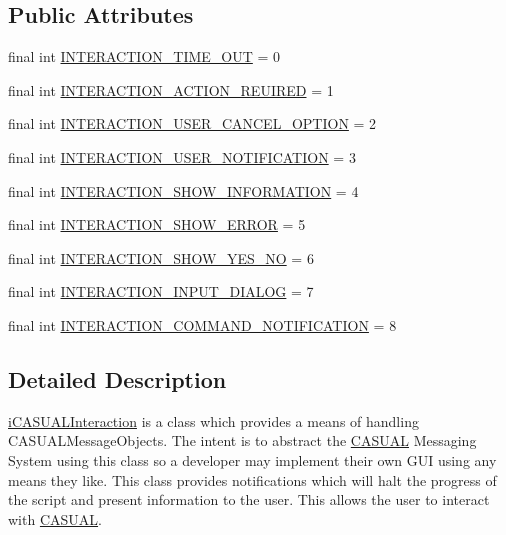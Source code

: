 \subsection*{Public Attributes}
\begin{DoxyCompactItemize}
\item 
final int \hyperlink{interfaceCASUAL_1_1iCASUALInteraction_ad8a93fbf136514ec2abf7042846bf8d8}{I\-N\-T\-E\-R\-A\-C\-T\-I\-O\-N\-\_\-\-T\-I\-M\-E\-\_\-\-O\-U\-T} = 0
\item 
final int \hyperlink{interfaceCASUAL_1_1iCASUALInteraction_a9cb2accb41f6b2de8f8076cda916924f}{I\-N\-T\-E\-R\-A\-C\-T\-I\-O\-N\-\_\-\-A\-C\-T\-I\-O\-N\-\_\-\-R\-E\-U\-I\-R\-E\-D} = 1
\item 
final int \hyperlink{interfaceCASUAL_1_1iCASUALInteraction_ab172a9affe078a64623627dc1ef6dcab}{I\-N\-T\-E\-R\-A\-C\-T\-I\-O\-N\-\_\-\-U\-S\-E\-R\-\_\-\-C\-A\-N\-C\-E\-L\-\_\-\-O\-P\-T\-I\-O\-N} = 2
\item 
final int \hyperlink{interfaceCASUAL_1_1iCASUALInteraction_aee60fbef84821ccb93b8508720af91e9}{I\-N\-T\-E\-R\-A\-C\-T\-I\-O\-N\-\_\-\-U\-S\-E\-R\-\_\-\-N\-O\-T\-I\-F\-I\-C\-A\-T\-I\-O\-N} = 3
\item 
final int \hyperlink{interfaceCASUAL_1_1iCASUALInteraction_a88a985d1905b2af7cfa06932e1019346}{I\-N\-T\-E\-R\-A\-C\-T\-I\-O\-N\-\_\-\-S\-H\-O\-W\-\_\-\-I\-N\-F\-O\-R\-M\-A\-T\-I\-O\-N} = 4
\item 
final int \hyperlink{interfaceCASUAL_1_1iCASUALInteraction_aaf019b0daffee32f5c487ee69a0c2886}{I\-N\-T\-E\-R\-A\-C\-T\-I\-O\-N\-\_\-\-S\-H\-O\-W\-\_\-\-E\-R\-R\-O\-R} = 5
\item 
final int \hyperlink{interfaceCASUAL_1_1iCASUALInteraction_aa943e8a9c4f74899de6071e708fe7fdb}{I\-N\-T\-E\-R\-A\-C\-T\-I\-O\-N\-\_\-\-S\-H\-O\-W\-\_\-\-Y\-E\-S\-\_\-\-N\-O} = 6
\item 
final int \hyperlink{interfaceCASUAL_1_1iCASUALInteraction_a96a9320c51af617e4bef953bb055c244}{I\-N\-T\-E\-R\-A\-C\-T\-I\-O\-N\-\_\-\-I\-N\-P\-U\-T\-\_\-\-D\-I\-A\-L\-O\-G} = 7
\item 
final int \hyperlink{interfaceCASUAL_1_1iCASUALInteraction_a7e7889527c716356d3df6039c1aae7c7}{I\-N\-T\-E\-R\-A\-C\-T\-I\-O\-N\-\_\-\-C\-O\-M\-M\-A\-N\-D\-\_\-\-N\-O\-T\-I\-F\-I\-C\-A\-T\-I\-O\-N} = 8
\end{DoxyCompactItemize}


\subsection{Detailed Description}
\hyperlink{interfaceCASUAL_1_1iCASUALInteraction}{i\-C\-A\-S\-U\-A\-L\-Interaction} is a class which provides a means of handling C\-A\-S\-U\-A\-L\-Message\-Objects. The intent is to abstract the \hyperlink{namespaceCASUAL}{C\-A\-S\-U\-A\-L} Messaging System using this class so a developer may implement their own G\-U\-I using any means they like. This class provides notifications which will halt the progress of the script and present information to the user. This allows the user to interact with \hyperlink{namespaceCASUAL}{C\-A\-S\-U\-A\-L}.

